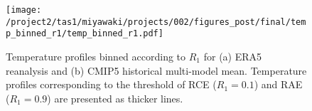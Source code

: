 \documentclass{ametsocV5}
\begin{document}




%

%

\begin{figure}
  \noindent\texttt{[image: /project2/tas1/miyawaki/projects/002/figures\_post/final/temp\_binned\_r1/temp\_binned\_r1.pdf]}\\
  \caption{Temperature profiles binned according to $R_{1}$ for (a) ERA5 reanalysis and (b) CMIP5 historical multi-model mean. Temperature profiles corresponding to the threshold of RCE ($R_1=0.1$) and RAE ($R_1=0.9$) are presented as thicker lines.}
  \label{fig:temp-binned-r1}
\end{figure}
\end{document}

